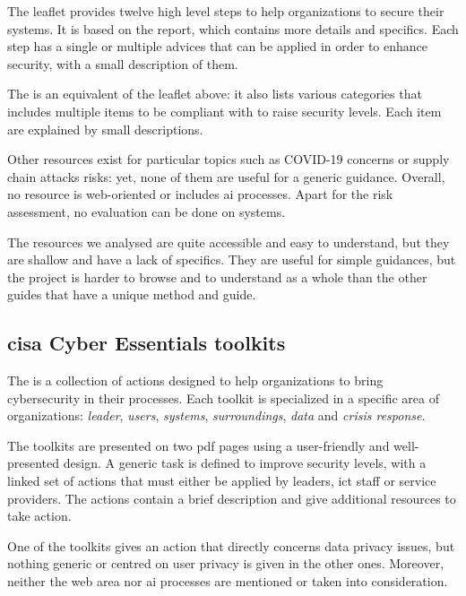 The  leaflet provides twelve high level steps to help organizations to secure their systems. It is based on the  report, which contains more details and specifics. Each step has a single or multiple advices that can be applied in order to enhance security, with a small description of them.

The  is an equivalent of the leaflet above: it also lists various categories that includes multiple items to be compliant with to raise security levels. Each item are explained by small descriptions.

Other resources exist for particular topics such as COVID-19 concerns or supply chain attacks risks: yet, none of them are useful for a generic guidance. Overall, no resource is web-oriented or includes \gls{ai} processes. Apart for the risk assessment, no evaluation can be done on systems.
 
The resources we analysed are quite accessible and easy to understand, but they are shallow and have a lack of specifics. They are useful for simple guidances, but the  project is harder to browse and to understand as a whole than the other guides that have a unique method and guide.

\subsection{\gls*{cisa} Cyber Essentials \Glspl{toolkit}}

The  is a collection of actions designed to help organizations to bring cybersecurity in their processes. Each \gls{toolkit} is specialized in a specific area of organizations: \textit{leader}, \textit{users}, \textit{systems}, \textit{surroundings}, \textit{data} and \textit{crisis response}.

The \glspl{toolkit} are presented on two \gls{pdf} pages using a user-friendly and well-presented design. A generic task is defined to improve security levels, with a linked set of actions that must either be applied by leaders, \gls{ict} staff or service providers. The actions contain a brief description and give additional resources to take action.

One of the \glspl{toolkit} gives an action that directly concerns data privacy issues, but nothing generic or centred on user privacy is given in the other ones. Moreover, neither the web area nor \gls{ai} processes are mentioned or taken into consideration.

